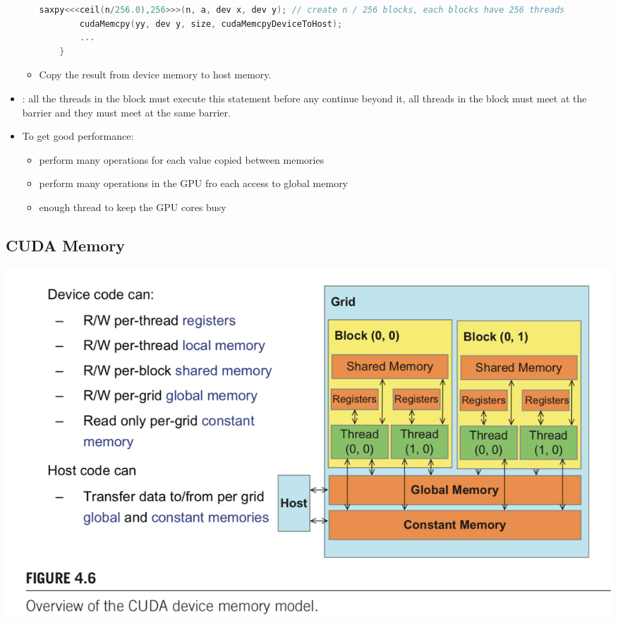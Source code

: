\documentclass[../main.tex]{subfiles}
\begin{document}
\begin{itemize}
\begin{itemize}
\begin{lstlisting}[language=c]
        saxpy<<<ceil(n/256.0),256>>>(n, a, dev x, dev y); // create n / 256 blocks, each blocks have 256 threads
        cudaMemcpy(yy, dev y, size, cudaMemcpyDeviceToHost); 
        ...
    }
                    \end{lstlisting}
		      \item Copy the result from device memory to host memory.
	      \end{itemize}
	\item {}: all the threads in the block must execute this statement before any continue beyond it, all threads in the block must meet at the barrier and they must meet at the same barrier.
	\item To get good performance:
	      \begin{itemize}
		      \item perform many operations for each value copied between memories
		      \item perform many operations in the GPU fro each access to global memory
		      \item enough thread to keep the GPU cores busy
	      \end{itemize}
\end{itemize}

\subsection{CUDA Memory}

\begin{center}
	\includegraphics[scale=0.4]{images/memory.png}
\end{center}
\end{document}
